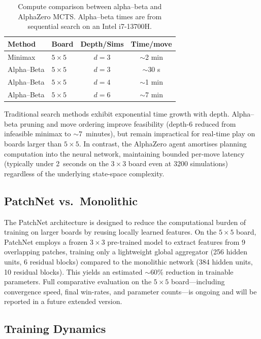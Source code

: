 \documentclass[11pt]{article}
\begin{document}
\begin{table}[t]
\centering
\caption{Compute comparison between alpha--beta and AlphaZero MCTS.
Alpha--beta times are from sequential search on an Intel i7-13700H.}
\label{tab:scalability}
\begin{tabular}{llcc}
\toprule
Method & Board & Depth/Sims & Time/move \\
\midrule
Minimax         & $5{\times}5$ & $d{=}3$ & $\sim$2 min \\
Alpha--Beta     & $5{\times}5$ & $d{=}3$ & $\sim$30 s \\
Alpha--Beta     & $5{\times}5$ & $d{=}4$ & $\sim$1 min \\
Alpha--Beta     & $5{\times}5$ & $d{=}6$ & $\sim$7 min \\
\bottomrule
\end{tabular}
\end{table}

Traditional search methods exhibit exponential time growth with depth.
Alpha--beta pruning and move ordering improve feasibility (depth-6
reduced from infeasible minimax to $\sim$7~minutes), but remain
impractical for real-time play on boards larger than $5{\times}5$.
In contrast, the AlphaZero agent amortises planning computation into the
neural network, maintaining bounded per-move latency (typically under
2~seconds on the $3{\times}3$ board even at 3200 simulations) regardless
of the underlying state-space complexity.

\subsection{PatchNet vs.\ Monolithic}

The PatchNet architecture is designed to reduce the computational burden
of training on larger boards by reusing locally learned features. On the
$5{\times}5$ board, PatchNet employs a frozen $3{\times}3$ pre-trained
model to extract features from 9 overlapping patches, training only a
lightweight global aggregator (256 hidden units, 6 residual blocks)
compared to the monolithic network (384 hidden units, 10 residual blocks).
This yields an estimated $\sim$60\% reduction in trainable parameters.
Full comparative evaluation on the $5{\times}5$ board---including
convergence speed, final win-rates, and parameter counts---is ongoing
and will be reported in a future extended version.

\subsection{Training Dynamics}
\end{document}
